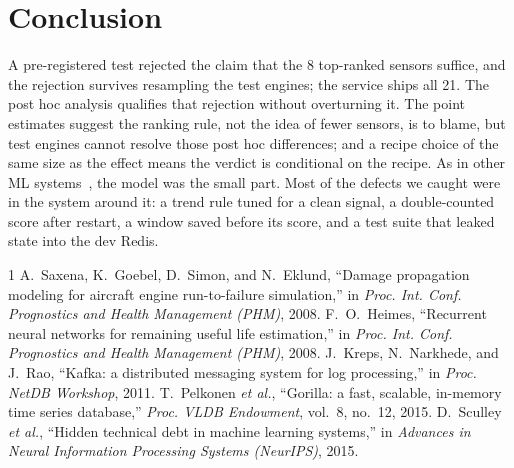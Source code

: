 \documentclass[conference]{IEEEtran}
\begin{document}
\section{Conclusion}
A pre-registered test rejected the claim that the 8 top-ranked sensors suffice, and the rejection survives
resampling the test engines; the service ships all 21.
The post hoc analysis qualifies that rejection without overturning it. The point estimates suggest the ranking
rule, not the idea of fewer sensors, is to blame, but \SplitTest{} test engines cannot resolve those post hoc differences;
and a recipe choice of the same size as the effect means the verdict is conditional on the recipe. As in other ML
systems~\cite{sculley2015}, the model was the small part. Most of the defects we caught were in the system
around it: a trend rule tuned for a clean signal, a double-counted score after restart, a window saved before
its score, and a test suite that leaked state into the dev Redis.


\begin{thebibliography}{1}
 A.~Saxena, K.~Goebel, D.~Simon, and N.~Eklund, ``Damage propagation modeling for aircraft engine run-to-failure simulation,'' in \emph{Proc. Int. Conf. Prognostics and Health Management (PHM)}, 2008.
 F.~O.~Heimes, ``Recurrent neural networks for remaining useful life estimation,'' in \emph{Proc. Int. Conf. Prognostics and Health Management (PHM)}, 2008.
 J.~Kreps, N.~Narkhede, and J.~Rao, ``Kafka: a distributed messaging system for log processing,'' in \emph{Proc. NetDB Workshop}, 2011.
 T.~Pelkonen \emph{et al.}, ``Gorilla: a fast, scalable, in-memory time series database,'' \emph{Proc. VLDB Endowment}, vol.~8, no.~12, 2015.
 D.~Sculley \emph{et al.}, ``Hidden technical debt in machine learning systems,'' in \emph{Advances in Neural Information Processing Systems (NeurIPS)}, 2015.
\end{thebibliography}
\end{document}
